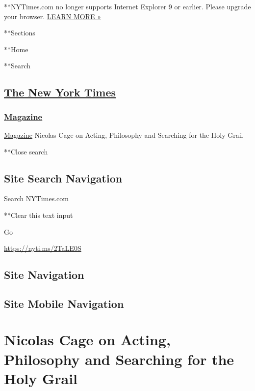  **NYTimes.com no longer supports Internet Explorer 9 or earlier. Please
upgrade your browser.
\href{http://www.nytimes3xbfgragh.onion/content/help/site/ie9-support.html}{LEARN
MORE »}

**Sections

**Home

**Search

\hypertarget{the-new-york-times}{%
\subsection{\texorpdfstring{\href{http://www.nytimes3xbfgragh.onion/}{The
New York Times}}{The New York Times}}\label{the-new-york-times}}

\hypertarget{-magazine-}{%
\subsubsection{\texorpdfstring{
\href{https://www.nytimes3xbfgragh.onion/section/magazine}{Magazine}
}{ Magazine }}\label{-magazine-}}

 \href{https://www.nytimes3xbfgragh.onion/section/magazine}{Magazine}
\textbar{}Nicolas Cage on Acting, Philosophy and Searching for the Holy
Grail

**Close search

\hypertarget{site-search-navigation}{%
\subsection{Site Search Navigation}\label{site-search-navigation}}

Search NYTimes.com

**Clear this text input

Go

\url{https://nyti.ms/2TaLE0S}

\hypertarget{site-navigation}{%
\subsection{Site Navigation}\label{site-navigation}}

\hypertarget{site-mobile-navigation}{%
\subsection{Site Mobile Navigation}\label{site-mobile-navigation}}

\hypertarget{nicolas-cage-on-acting-philosophy-and-searching-for-the-holy-grail}{%
\section{Nicolas Cage on Acting, Philosophy and Searching for the Holy
Grail}\label{nicolas-cage-on-acting-philosophy-and-searching-for-the-holy-grail}}

